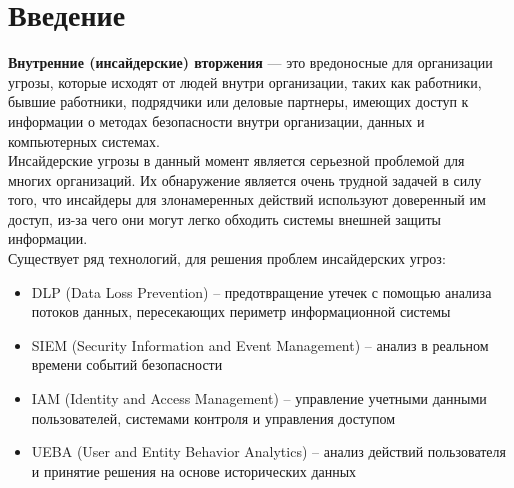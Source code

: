 


\chapter{Введение}

\textbf{Внутренние (инсайдерские) вторжения} — это вредоносные для организации угрозы, которые исходят от людей внутри организации, таких как работники, бывшие работники, подрядчики или деловые партнеры, имеющих доступ к информации о методах безопасности внутри организации, данных и компьютерных системах.\\

Инсайдерские угрозы в данный момент является серьезной проблемой для многих организаций. Их обнаружение является очень трудной задачей в силу того, что инсайдеры для злонамеренных действий используют доверенный им доступ, из-за чего они могут легко обходить системы внешней защиты информации.\\

Существует ряд технологий, для решения проблем инсайдерских угроз:\\
\begin{itemize}
\item DLP (Data Loss Prevention) – предотвращение утечек с помощью анализа потоков данных, пересекающих периметр информационной системы\\
\item SIEM (Security Information and Event Management) – анализ в реальном времени событий безопасности\\
\item IAM (Identity and Access Management) – управление учетными данными пользователей, системами контроля и управления доступом\\
\item UEBA (User and Entity Behavior Analytics) – анализ действий пользователя и принятие решения на основе исторических данных\\
\end{itemize}

